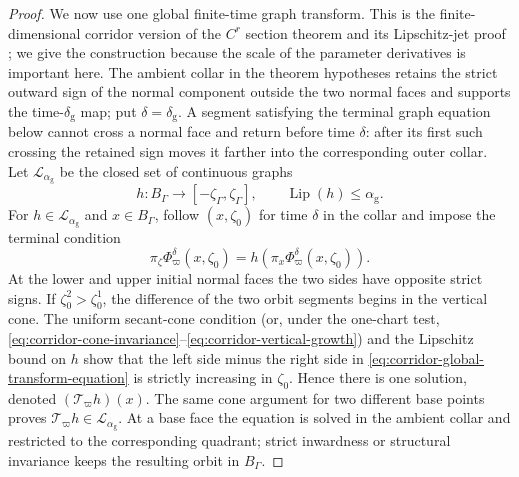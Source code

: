 \documentclass[11pt]{amsart}
\numberwithin{equation}{section}
\theoremstyle{definition}
\theoremstyle{remark}
\begin{document}
\begin{proof}
We now use one global finite-time graph transform.  This is the
finite-dimensional corridor version of the $C^r$ section theorem and its
Lipschitz-jet proof \cite[Chapter~3]{HirschPughShub1977InvariantManifolds};
we give the construction because the scale of the parameter derivatives is
important here.  The ambient collar in the theorem hypotheses retains the strict
outward sign of the normal component outside the two normal faces and
supports the time-$\delta_{\mathrm g}$ map; put
$\delta=\delta_{\mathrm g}$.  A segment satisfying the terminal graph
equation below cannot cross a normal face and return before time $\delta$:
after its first such
crossing the retained sign moves it farther into the corresponding outer
collar.  Let $\mathcal L_{\alpha_{\mathrm g}}$ be the
closed set of continuous graphs
\[
 h:B_\Gamma\longrightarrow[-\zeta_\Gamma,\zeta_\Gamma],
 \qquad \operatorname{Lip}(h)\le\alpha_{\mathrm g}.
\]
For $h\in\mathcal L_{\alpha_{\mathrm g}}$ and $x\in B_\Gamma$, follow
$(x,\zeta_0)$ for time $\delta$ in the collar and impose the terminal
condition
\begin{equation}\label{eq:corridor-global-transform-equation}
 \pi_\zeta\Phi_\varpi^\delta(x,\zeta_0)
 =h\!\left(\pi_x\Phi_\varpi^\delta(x,\zeta_0)\right).
\end{equation}
At the lower and upper initial normal faces the two sides have opposite
strict signs.  If $\zeta_0^2>\zeta_0^1$, the difference of the two orbit
segments begins in the vertical cone.  The uniform secant-cone condition
(or, under the one-chart test,
\eqref{eq:corridor-cone-invariance}--\eqref{eq:corridor-vertical-growth})
and the Lipschitz bound on $h$ show that the left side minus the right side
in \eqref{eq:corridor-global-transform-equation} is strictly increasing in
$\zeta_0$.  Hence there is one solution, denoted
$(\mathcal T_\varpi h)(x)$.  The same cone argument for two different base
points proves
$\mathcal T_\varpi h\in\mathcal L_{\alpha_{\mathrm g}}$.  At a base face
the equation is solved in the ambient collar and restricted to the
corresponding quadrant; strict inwardness or structural invariance keeps
the resulting orbit in $B_\Gamma$.


\end{proof}
\end{document}
